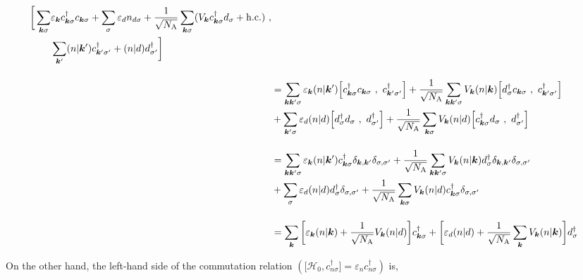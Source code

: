 \documentclass[a4j]{jarticle}
\begin{document}
\begin{align}
	\begin{split}
		\bigg[
			\sum_{\bm{k}\sigma}
		 & \varepsilon_{\bm{k}}
			c^{\dagger}_{\bm{k} \sigma}
			c_{\bm{k} \sigma}
			+
			\sum_{\sigma}
			\varepsilon_{d}
			n_{d \sigma}
			+
			\frac{1}{\sqrt{N_{\rm A}}}
			\sum_{\bm{k}\sigma}
			(
			V_{\bm{k}}
			c_{\bm{k}\sigma}^{\dagger}
			d_{\sigma}
			+
			{\rm h.c.}
			)
			\
			,
		\\
		 & \sum_{\bm{k}'}
			( n | \bm{k}' )
			c^{\dagger}_{\bm{k}' \sigma'}
			+
			( n | d )
			d^{\dagger}_{\sigma'}
			\bigg]
	\end{split}
	\nonumber \\[4mm] &=
	\sum_{\bm{k} \bm{k}' \sigma}
	\varepsilon_{\bm{k}}
	( n | \bm{k}' )
	\Big[
		c^{\dagger}_{\bm{k} \sigma}
		c_{\bm{k} \sigma}
		\
		,
		\
		c^{\dagger}_{\bm{k}' \sigma'}
		\Big]
	+
	\frac{1}{\sqrt{N_{\rm A}}}
	\sum_{\bm{k} \bm{k}' \sigma}
	V_{\bm{k}}
	(n | \bm{k})
	\Big[
		d_{\sigma}^{\dagger}
		c_{\bm{k}\sigma}
		\
		,
		\
		c^{\dagger}_{\bm{k}' \sigma'}
		\Big]
	\nonumber \\ &
	+
	\sum_{\bm{k}' \sigma}
	\varepsilon_{d}
	( n | d )
	\Big[
		d^{\dagger}_{\sigma}
		d_{\sigma}
		\
		,
		\
		d^{\dagger}_{\sigma'}
		\Big]
	+
	\frac{1}{\sqrt{N_{\rm A}}}
	\sum_{\bm{k} \sigma}
	V_{\bm{k}} (n | d)
	\Big[
		c_{\bm{k}\sigma}^{\dagger}
		d_{\sigma}
		\
		,
		\
		d^{\dagger}_{\sigma'}
		\Big]
	\nonumber \\[4mm] &=
	\sum_{\bm{k} \bm{k}' \sigma}
	\varepsilon_{\bm{k}}
	( n | \bm{k}' )
	c^{\dagger}_{\bm{k} \sigma}
	\delta_{\bm{k}, \bm{k}'}
	\delta_{\sigma, \sigma'}
	+
	\frac{1}{\sqrt{N_{\rm A}}}
	\sum_{\bm{k} \bm{k}' \sigma}
	V_{\bm{k}} (n | \bm{k})
	d_{\sigma}^{\dagger}
	\delta_{\bm{k}, \bm{k}'}
	\delta_{\sigma, \sigma'}
	\nonumber \\ &
	+
	\sum_{\sigma}
	\varepsilon_{d}
	( n | d )
	d^{\dagger}_{\sigma}
	\delta_{\sigma, \sigma'}
	+
	\frac{1}{\sqrt{N_{\rm A}}}
	\sum_{\bm{k} \sigma}
	V_{\bm{k}} (n | d)
	c_{\bm{k}\sigma}^{\dagger}
	\delta_{\sigma, \sigma'}
	\nonumber \\[4mm] &=
	\sum_{\bm{k}}
	\bigg[
		\varepsilon_{\bm{k}}
		( n | \bm{k} )
		+
		\frac{1}{\sqrt{N_{\rm A}}}
		V_{\bm{k}} (n | d)
		\bigg]
	c^{\dagger}_{\bm{k} \sigma}
	+
	\bigg[
		\varepsilon_{d}
		( n | d )
		+
		\frac{1}{\sqrt{N_{\rm A}}}
		\sum_{\bm{k}}
		V_{\bm{k}} (n | \bm{k})
		\bigg]
	d^{\dagger}_{\sigma}
\end{align}

On the other hand, the left-hand side of the commutation relation $( \displaystyle \big[ \mathcal{H}_{0} , c^{\dagger}_{n \sigma} \big] = \varepsilon_{n} c^{\dagger}_{n \sigma} )$ is,
\end{document}
